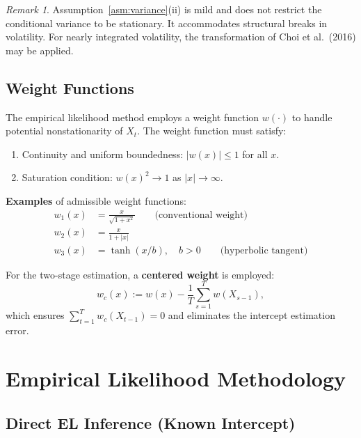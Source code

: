 \documentclass[11pt,a4paper]{article}
\theoremstyle{definition}
\theoremstyle{remark}
\newtheorem{remark}{Remark}[section]
\begin{document}
\begin{remark}
Assumption~\ref{asm:variance}(ii) is mild and does not restrict the conditional variance
to be stationary. It accommodates structural breaks in volatility.
For nearly integrated volatility, the transformation of Choi et al.\ (2016) may be applied.
\end{remark}

\subsection{Weight Functions}

The empirical likelihood method employs a weight function $w(\cdot)$ to handle
potential nonstationarity of $X_t$. The weight function must satisfy:

\begin{enumerate}[leftmargin=*, label=(\roman*)]
    \item Continuity and uniform boundedness: $|w(x)| \leq 1$ for all $x$.
    \item Saturation condition: $w(x)^2 \to 1$ as $|x| \to \infty$.
\end{enumerate}

\medskip
\noindent\textbf{Examples} of admissible weight functions:
\begin{align}
    w_1(x) &= \frac{x}{\sqrt{1 + x^2}} \qquad \text{(conventional weight)} \label{eq:w1}\\
    w_2(x) &= \frac{x}{1 + |x|} \label{eq:w2}\\
    w_3(x) &= \tanh(x/b), \quad b > 0 \qquad \text{(hyperbolic tangent)} \label{eq:w3}
\end{align}

For the two-stage estimation, a \textbf{centered weight} is employed:
\begin{equation}\label{eq:centered_weight}
    w_c(x) := w(x) - \frac{1}{T}\sum_{s=1}^T w(X_{s-1}),
\end{equation}
which ensures $\sum_{t=1}^T w_c(X_{t-1}) = 0$ and eliminates the intercept estimation error.

\section{Empirical Likelihood Methodology}

\subsection{Direct EL Inference (Known Intercept)}
\end{document}
